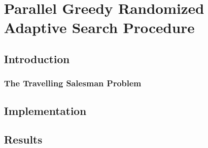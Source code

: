 \chapter{Parallel Greedy Randomized Adaptive Search Procedure}
\section{Introduction}
\subsection{The Travelling Salesman Problem}
\section{Implementation}
\section{Results}

